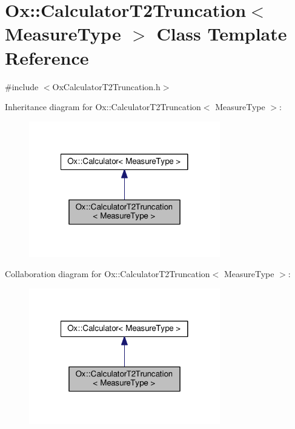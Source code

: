 \hypertarget{class_ox_1_1_calculator_t2_truncation}{\section{Ox\-:\-:Calculator\-T2\-Truncation$<$ Measure\-Type $>$ Class Template Reference}
\label{class_ox_1_1_calculator_t2_truncation}
}


{\ttfamily \#include $<$Ox\-Calculator\-T2\-Truncation.\-h$>$}



Inheritance diagram for Ox\-:\-:Calculator\-T2\-Truncation$<$ Measure\-Type $>$\-:
\nopagebreak
\begin{figure}[H]
\begin{center}
\leavevmode
\includegraphics[width=236pt]{class_ox_1_1_calculator_t2_truncation__inherit__graph}
\end{center}
\end{figure}


Collaboration diagram for Ox\-:\-:Calculator\-T2\-Truncation$<$ Measure\-Type $>$\-:
\nopagebreak
\begin{figure}[H]
\begin{center}
\leavevmode
\includegraphics[width=236pt]{class_ox_1_1_calculator_t2_truncation__coll__graph}
\end{center}
\end{figure}
